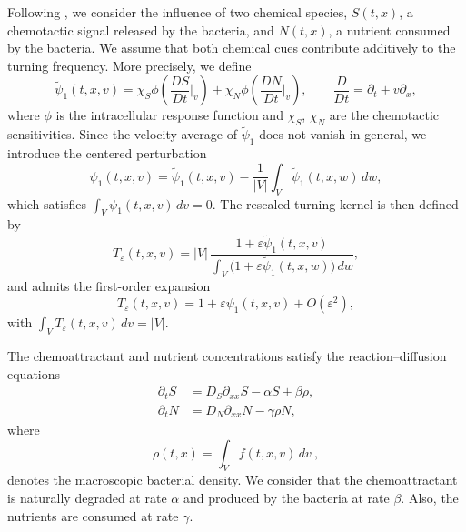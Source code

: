 \documentclass[11pt,twoside]{article}
\numberwithin{equation}{section}
\theoremstyle{plain}
\theoremstyle{nonumberplain}
\begin{document}
 Following \cite{saragosti2010mathematical}, we consider the influence of two chemical species, $S(t,x)$, a chemotactic signal released by the bacteria, and $N(t,x)$, a nutrient consumed by the bacteria. We assume that both chemical cues contribute additively to the turning frequency. 
More precisely, we define
\[
\widetilde{\psi}_1(t,x,v)
=
\chi_S \phi\!\left(\frac{DS}{Dt}\Big|_v\right)
+
\chi_N \phi\!\left(\frac{DN}{Dt}\Big|_v\right),
\qquad
\frac{D}{Dt} = \partial_t + v \partial_x,
\]
where $\phi$ is the intracellular response function and $\chi_S$, $\chi_N$ are the
chemotactic sensitivities. Since the velocity average of $\widetilde{\psi}_1$ does not
vanish in general, we introduce the centered perturbation
\begin{equation}\label{eq: centered psi1}
\psi_1(t,x,v)
=
\widetilde{\psi}_1(t,x,v)
-
\frac1{|V|}\int_V \widetilde{\psi}_1(t,x,w)\,dw,
\end{equation}
which satisfies $\int_V \psi_1(t,x,v)\,dv = 0.$
The rescaled turning kernel is then defined by
\[
T_\varepsilon(t,x,v)
=
|V|\,
\frac{1+\varepsilon \widetilde{\psi}_1(t,x,v)}
{\displaystyle \int_V \bigl(1+\varepsilon \widetilde{\psi}_1(t,x,w)\bigr)\,dw},
\]
and admits the first-order expansion
\begin{equation}\label{eq: T expansion}
T_\varepsilon(t,x,v)=1+\varepsilon \psi_1(t,x,v)+O(\varepsilon^2),
\end{equation}
with
$\int_V T_\varepsilon(t,x,v)\,dv = |V|.$







 

The chemoattractant and nutrient concentrations satisfy the reaction--diffusion equations
\begin{subequations}
\label{eq:SN_intro}
\begin{align}
\partial_t S &= D_S \partial_{xx} S - \alpha S + \beta \rho, \\
\partial_t N &= D_N \partial_{xx} N - \gamma \rho N,
\end{align}
\end{subequations}
where
\[
\rho(t,x) = \int_V f(t,x,v)\,dv\ ,
\]
denotes the macroscopic bacterial density. We consider that the chemoattractant is naturally degraded at rate $\alpha$ and produced by the bacteria at rate $\beta$. Also, the nutrients are consumed at rate $\gamma$.
\end{document}
